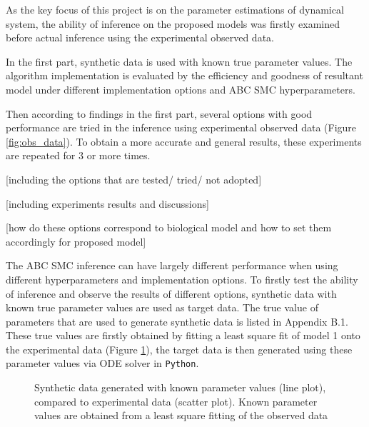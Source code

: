 As the key focus of this project is on the parameter estimations of dynamical system, the ability of inference on the proposed models was firstly examined before actual inference using the experimental observed data.

In the first part, synthetic data is used with known true parameter values. The algorithm implementation is evaluated by the efficiency and goodness of resultant model under different implementation options and ABC SMC hyperparameters.

Then according to findings in the first part, several options with good performance are tried in the inference using experimental observed data (Figure \ref{fig:obs_data}). To obtain a more accurate and general results, these experiments are repeated for 3 or more times.

    [including the options that are tested/ tried/ not adopted]

    [including experiments results and discussions]

    [how do these options correspond to biological model and how to set them accordingly for proposed model]

The ABC SMC inference can have largely different performance when using different hyperparameters and implementation options. To firstly test the ability of inference and observe the results of different options, synthetic data with known true parameter values are used as target data. The true value of parameters that are used to generate synthetic data is listed in Appendix B.1. These true values are firstly obtained by fitting a least square fit of model 1 onto the experimental data (Figure \ref{fig:infer_back_data}), the target data is then generated using these parameter values via ODE solver in \verb|Python|.

\begin{figure}[h!]
    \begin{center}
    \end{center}

    \caption[Synthetic data generated with known parameter values]%
    {Synthetic data generated with known parameter values (line plot), compared to experimental data (scatter plot). Known parameter values are obtained from a least square fitting of the observed data}
    \label{fig:infer_back_data}

\end{figure}

